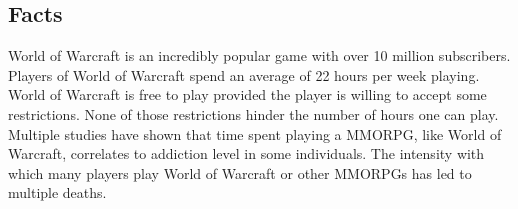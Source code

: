 \documentclass[11pt]{article}
\begin{document}
\newpage



\begin{multicols}{2}
\setcounter{page}{1}

\section{Facts}

World of Warcraft is an incredibly popular game with over 10 million subscribers. \cite{WoWPlayerCount} Players of World of Warcraft spend an average of 22 hours per week playing. \cite{PlayerMotivations} World of Warcraft is free to play provided the player is willing to accept some restrictions. None of those restrictions hinder the number of hours one can play. \cite{StarterEditionFAQ} Multiple studies have shown that time spent playing a MMORPG, like World of Warcraft, correlates to addiction level in some individuals. \cite{ProblemUsageAmongHighlyEngagedPlayers}\cite{JustAComputerGameRight} The intensity with which many players play World of Warcraft or other MMORPGs has led to multiple deaths. \cite{SnowlyDeath}\cite{ShawnDeath}




\end{multicols}
\end{document}
